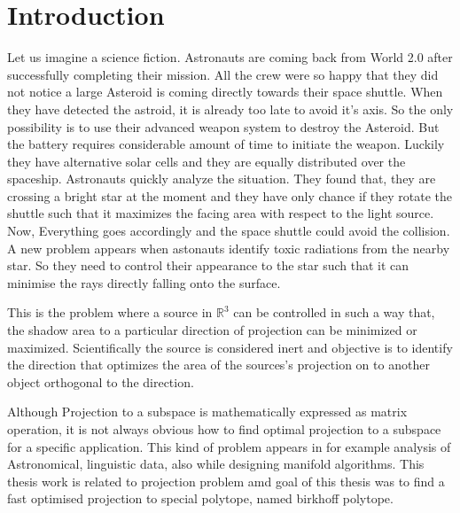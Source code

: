 
\chapter{Introduction} %

\label{ChapterX} %


Let us imagine a science fiction. Astronauts are coming back from World 2.0 after successfully completing their mission. All the crew were so happy that they did not notice a large Asteroid is coming directly towards their space shuttle. When they have detected the astroid, it is already too late to avoid it's axis. So the only possibility is to use their advanced weapon system to destroy the Asteroid. But the battery requires considerable amount of time to initiate the weapon. Luckily they have alternative solar cells and they are equally distributed over the spaceship. Astronauts quickly analyze the situation. They found that, they are crossing a bright star at the moment and they have only chance if they rotate the shuttle such that it maximizes the facing area with respect to the light source. Now, Everything goes accordingly and the space shuttle could avoid the collision. A new problem appears when astonauts identify toxic radiations from the nearby star. So they need to control their appearance to the star such that it can minimise the rays directly falling onto the surface. 


This is the problem where a source in $\mathbb{R}^3$ can be controlled in such a way that, the shadow area to a particular direction of projection can be minimized or maximized. Scientifically the source is considered inert and objective is to identify the direction that optimizes the area of the sources's projection on to another object orthogonal to the direction.


Although Projection to a subspace is mathematically expressed as matrix operation, it is not always obvious how to find optimal projection to a subspace for a specific application. This kind of problem appears in for example analysis of Astronomical, linguistic data, also while designing manifold algorithms. This thesis work is related to projection problem amd goal of this thesis was to find a fast optimised projection to special polytope, named birkhoff polytope.

